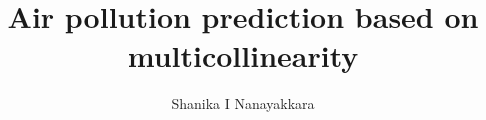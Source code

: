 \documentclass{amsart}
\begin{document}
%
%
\title[Kaggle Project]{Air pollution prediction based on multicollinearity}%

\author{Shanika I Nanayakkara}
\address[A.~2]{School of Information Technology \\
Deakin University, Geelong, Australia}%

%

\date{\gitAuthorDate}%



\maketitle

\tableofcontents

\newpage



\newpage


\end{document}
